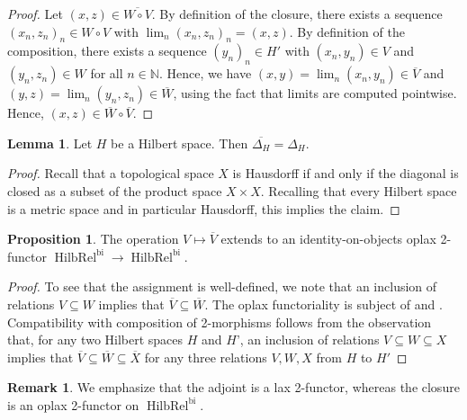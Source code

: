 \documentclass{article}
\newcommand{\HilbRel}{\operatorname{HilbRel}}%
\numberwithin{equation}{section}
\theoremstyle{definition}
\newtheorem{lemma}[definition]{Lemma}
\newtheorem{proposition}[definition]{Proposition}
\newtheorem{remark}[definition]{Remark}
\theoremstyle{theorem}
\begin{document}
\begin{proof}
    Let $(x,z) \in \overline{W \circ V}$. By definition of the closure, there exists a sequence $(x_n,z_n)_n \in W \circ V$ with $\lim_n (x_n,z_n)_n =(x,z)$. 
    By definition of the composition, there exists a sequence $(y_n)_n \in H'$ with $(x_n,y_n) \in V$ and $(y_n,z_n) \in W$ for all $n \in \mathbb{N}$. Hence, 
    we have $(x,y) = \lim_n (x_n,y_n) \in \overline{V}$ and $(y,z) = \lim_n (y_n,z_n) \in \overline{W}$, using the fact that limits are computed pointwise.
    Hence, $(x,z) \in \overline{W} \circ \overline{V}$. 
\end{proof}
\begin{lemma}\label{Lemma: the diagonal of a Hilbert space is closed}
    Let $H$ be a Hilbert space. Then $\overline{\Delta_H} = \Delta_H$.
\end{lemma}
\begin{proof}
    Recall that a topological space $X$ is Hausdorff if and only if the diagonal is closed as a subset of the product space $X \times X$. 
    Recalling that every Hilbert space is a metric space and in particular Hausdorff, this implies the claim.
\end{proof}
\begin{proposition}
    The operation $V \mapsto \overline{V}$ extends to an identity-on-objects oplax 2-functor $\HilbRel^{\text{bi}} \to \HilbRel^{\text{bi}}$. 
\end{proposition}
\begin{proof}
    To see that the assignment is well-defined, we note that an inclusion of relations $V \subseteq W$ implies that $\overline{V} \subseteq \overline{W}$. 
    The oplax functoriality is subject of  and . 
    Compatibility with composition of 2-morphisms follows from the observation that, for any two Hilbert spaces $H$ and $H$', an inclusion of relations 
    $V \subseteq W \subseteq X$ implies that $\overline{V} \subseteq \overline{W} \subseteq \overline{X}$ for any three relations $V,W,X$ from $H$ to $H'$
\end{proof}
\begin{remark}
    We emphasize that the adjoint is a lax 2-functor, whereas the closure is an oplax 2-functor on $\HilbRel^{\text{bi}}$.
\end{remark}
\end{document}
